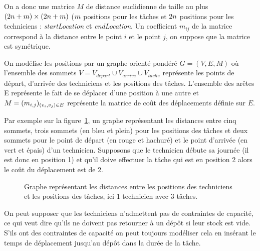  On a donc une matrice $M$ de distance euclidienne de taille au plus $(2n+m)\times(2n+m)$ ($m$ positions pour les tâches et $2n$ positions pour les techniciens : \textit{startLocation} et \textit{endLocation}.
 Un coefficient $m_{ij}$ de la matrice correspond à la distance entre le point $i$ et le point $j$, on suppose que la matrice est symétrique.

On modélise les positions par un graphe orienté pondéré $G=(V,E,M)$ où l'ensemble des sommets $V=V_{depart}\cup V_{arrive}\cup V_{tache}$ représente les points de départ, d'arrivée des techniciens et les positions des tâches. L'ensemble des arêtes E représente le fait de se déplacer d'une position à une autre et $M = (m_{i,j})_{(v_i,v_j)\in E}$ représente la matrice de coût des déplacements définie sur $E$.

Par exemple sur la figure~\ref{fig:grapheDist}, un graphe représentant les distances entre cinq sommets, trois sommets (en bleu et plein) pour les positions des tâches et deux sommets pour le point de départ (en rouge et hachuré) et le point d'arrivée (en vert et épais) d'un technicien. Supposons que le technicien débute sa journée (il est donc en position 1) et qu'il doive effectuer la tâche qui est en position 2 alors le coût du déplacement est de 2.

\begin{figure}[H]
\centering
{}
\caption{Graphe représentant les distances entre les positions des techniciens et les positions des tâches, ici 1 technicien avec 3 tâches. \label{fig:grapheDist}}
\end{figure}
\par On peut supposer que les techniciens n'admettent pas de contraintes de capacité, ce qui veut dire qu'ils ne doivent pas retourner à un dépôt si leur stock est vide. S'ils ont des contraintes de capacité on peut toujours modéliser cela en insérant le temps de déplacement jusqu'au dépôt dans la durée de la tâche.
